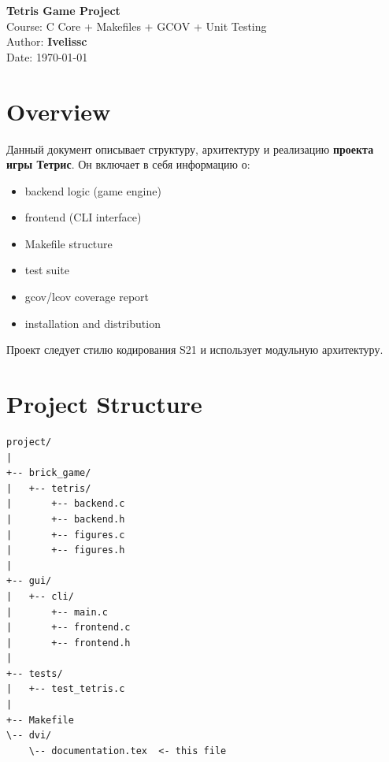 \documentclass[12pt,a4paper]{article}
\begin{document}
\begin{titlepage}
    \centering
    {\Large \textbf{Tetris Game Project}}\\[10pt]
    {\large Course: C Core + Makefiles + GCOV + Unit Testing}\\[10pt]
    {\large Author: \textbf{Ivelissc}}\\[10pt]
    {\large Date: \today}\\[40pt]
    \vfill
\end{titlepage}

\tableofcontents
\newpage

\section{Overview}

Данный документ описывает структуру, архитектуру и реализацию \textbf{проекта игры Тетрис}.
Он включает в себя информацию о:

\begin{itemize}
    \item backend logic (game engine)
    \item frontend (CLI interface)
    \item Makefile structure
    \item test suite
    \item gcov/lcov coverage report
    \item installation and distribution
\end{itemize}

Проект следует стилю кодирования S21 и использует модульную архитектуру.

\section{Project Structure}

\begin{lstlisting}
project/
|
+-- brick_game/
|   +-- tetris/
|       +-- backend.c
|       +-- backend.h
|       +-- figures.c
|       +-- figures.h
|
+-- gui/
|   +-- cli/
|       +-- main.c
|       +-- frontend.c
|       +-- frontend.h
|
+-- tests/
|   +-- test_tetris.c
|
+-- Makefile
\-- dvi/
    \-- documentation.tex  <- this file
\end{lstlisting}
\end{document}
